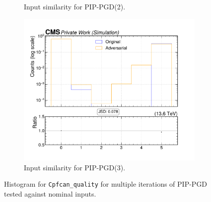 \begin{figure}[htbp]
\begin{subfigure}[t]{0.32\textwidth}
    \caption*{Input similarity for PIP-PGD(2).}
  \end{subfigure}\hfill
  \begin{subfigure}[t]{0.32\textwidth}
    \includegraphics[width=\linewidth]{media/output/features/compare/combined_it_3/cmp_cpf_arr_Cpfcan_quality.pdf}
    \caption*{Input similarity for PIP-PGD(3).}
  \end{subfigure}

  \caption*{Histogram for \texttt{Cpfcan\_quality} for multiple iterations of PIP-PGD tested against nominal inputs.}
  \label{fig:combined_input_Cpfcan_quality}
\end{figure}

